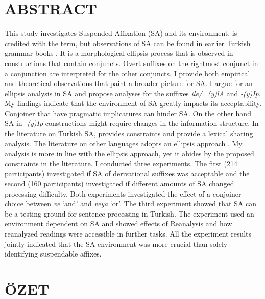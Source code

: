 \chapter*{ABSTRACT\\ \ttitle}

This study investigates Suspended Affixation (SA) and its environment. \cite{geoffrey1967turkish} is credited with the term, but observations of SA can be found in earlier Turkish grammar books \citep{emre1945turk,gencan1966dilbilgisi}. It is a morphological ellipsis process that is observed in constructions that contain conjuncts. Overt suffixes on the rightmost conjunct in a conjunction are interpreted for the other conjuncts. I provide both empirical and theoretical observations that paint a broader picture for SA. I argue for an ellipsis analysis in SA and propose analyses for the suffixes \textit{ile/=(y)lA} and \textit{-(y)Ip}. My findings indicate that the environment of SA greatly impacts its acceptability. Conjoiner that have pragmatic implicatures can hinder SA. On the other hand SA in \textit{-(y)Ip} constructions might require changes in the information structure. In the literature on Turkish SA, \cite{kabak2007turkish} provides constraints and \cite{orgun1995flat,kornfilt2012revisiting,broadwell2008turkish} provide a lexical sharing analysis. The literature on other languages adopts an ellipsis approach \citep{guseva2017postsyntactic,erschler2018suspended}. My analysis is more in line with the ellipsis approach, yet it abides by the proposed constraints in the literature. I conducted three experiments. The first (214 participants) investigated if SA of derivational suffixes was acceptable and the second (160 participants) investigated if different amounts of SA changed processing difficulty. Both experiments investigated the effect of a conjoiner choice between \textit{ve} `and' and \textit{veya} `or'. The third experiment showed that SA can be a testing ground for sentence processing in Turkish. The experiment used an environment dependent on SA and showed effects of Reanalysis and how reanalyzed readings were accessible in further tasks. All the experiment results jointly indicated that the SA environment was more crucial than solely identifying suspendable affixes.  

\newpage

\chapter*{ÖZET\\ \ttitletr}

